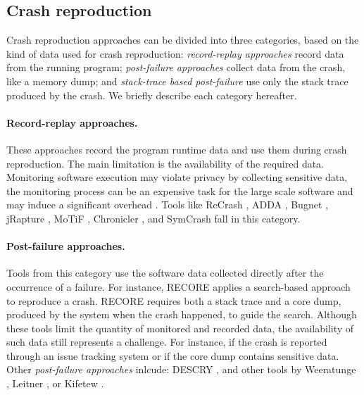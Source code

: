 
\subsection{Crash reproduction}

Crash reproduction approaches can be divided into three categories, based on the kind of data used for crash reproduction: \emph{record-replay approaches} record data from the running program; \emph{post-failure approaches} collect data from the crash, like a memory dump; and \emph{stack-trace based post-failure} use only the stack trace produced by the crash. We briefly describe each category hereafter.

\paragraph{Record-replay approaches.}

These approaches record the program runtime data and use them during crash reproduction. The main limitation is the availability of the required data. Monitoring software execution may violate privacy by collecting sensitive data, the monitoring process can be an expensive task for the large scale software and may induce a significant overhead \cite{Chen2015, Nayrolles2017, Rossler2013}.
%
Tools like \textrm{ReCrash} \cite{Artzi2008}, \textrm{ADDA} \cite{Clause2007}, \textrm{Bugnet} \cite{Narayanasamy2005}, \textrm{jRapture} \cite{Steven2000}, \textrm{MoTiF} \cite{Gomez2016}, \textrm{Chronicler} \cite{Bell2013}, and \textrm{SymCrash} \cite{Cao2014} fall in this category.

\paragraph{Post-failure approaches.}

Tools from this category use the software data collected directly after the occurrence of a failure. For instance, \textrm{RECORE} \cite{Rossler2013} applies a search-based approach to reproduce a crash. 
\textrm{RECORE} requires both a stack trace and a core dump, produced by the system when the crash happened, to guide the search. 
Although these tools limit the quantity of monitored and recorded data, the availability of such data still represents a challenge. For instance, if the crash is reported through an issue tracking system or if the core dump contains sensitive data. 
%
Other \textit{post-failure approaches} inlcude: \textrm{DESCRY} \cite{YZW17descry}, and other tools by Weeratunge \etal \cite{Weeratunge2010}, Leitner \etal \cite{Leitner2007, Leitner2009}, or Kifetew \etal \cite{Kifetew2013, Kifetew2014}.

